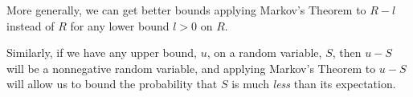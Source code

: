 More generally, we can get better bounds applying Markov's Theorem to
$R-l$ instead of $R$ for any lower bound $l>0$ on $R$.

Similarly, if we have any upper bound, $u$, on a random variable, $S$,
then $u-S$ will be a nonnegative random variable, and applying Markov's
Theorem to $u-S$ will allow us to bound the probability that $S$ is much
\emph{less} than its expectation.

\iffalse
Suppose we know that $R \geq \ell$, then can we do better?
Let $T=R-\ell$.  Note that $T \geq 0$.  So, we can use Markov's
Theorem on $T$, to say that
\begin{equation*}
\pr{R  \geq x }   & = &   \pr{T \geq x -\ell}
  \leq
  \frac{\expect{T}}{x -\ell}
  =   \frac{\expect{R - \ell}}{x - \ell}
  =   \frac{\expect{R} - \ell}{x - \ell}
\end{equation*}
This gives a somewhat better bound on the probability that
$R$ goes crazy!
\fi

